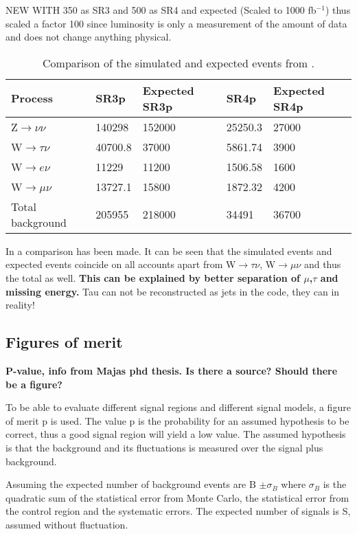 NEW WITH 350 as SR3 and 500 as SR4 and expected (Scaled to 1000 fb$^{-1}$) thus scaled a factor 100 since luminosity is only a measurement of the amount of data and does not change anything physical.
\begin{table}[ht]
\begin{center}
\begin{tabular}{|l|l|l|l|l|}
\hline
Process & SR3p & Expected SR3p & SR4p  & Expected SR4p \\ \hline
Z$\rightarrow\nu\nu$&140298&152000&25250.3&27000 \\
W$\rightarrow\tau\nu$&40700.8&37000&5861.74&3900 \\
W$\rightarrow e\nu$&11229&11200&1506.58&1600 \\
W$\rightarrow\mu\nu$&13727.1&15800&1872.32&4200 \\ \hline
Total background&205955&218000&34491&36700 \\ \hline
\end{tabular}
\caption{Comparison of the simulated and expected events from \citep{ATLAS-CONF-2012-147}.}
\label{tab:Compare1}
\end{center}
\end{table}

In  a comparison has been made. It can be seen that the simulated events and expected events coincide on all accounts apart from W$\rightarrow\tau\nu$, W$\rightarrow\mu\nu$ and thus the total as well. \textbf{This can be explained by better separation of $\mu$,$\tau$ and missing energy.} 
Tau can not be reconstructed as jets in the code, they can in reality!

\subsection{Figures of merit}
\textbf{P-value, info from Majas phd thesis. Is there a source? Should there be a figure?}

To be able to evaluate different signal regions and different signal models, a figure of merit p is used. The value p is the probability for an assumed hypothesis to be correct, thus a good signal region will yield a low value. The assumed hypothesis is that the background and its fluctuations is measured over the signal plus background.

Assuming the expected number of background events are B $\pm \sigma_B$ where $\sigma_B$ is the quadratic sum of the statistical error from Monte Carlo, the statistical error from the control region and the systematic errors. The expected number of signals is S, assumed without fluctuation. 

